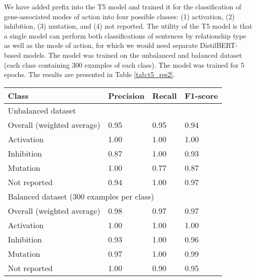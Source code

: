 \documentclass[final,12pt,3p,times,twocolumn,authoryear]{elsarticle}
\begin{document}
We have added prefix into the T5 model and trained it for the classification of gene-associated modes of action into four possible classes: (1) activation, (2) inhibition, (3) mutation, and  (4) not reported. The utility of the T5 model is that a single model can perform both classifications of sentences by relationship type as well as the mode of action, for which we would need separate DistilBERT-based models.  The model was trained on the unbalanced and balanced dataset (each class containing 300 examples of each class). The model was trained for 5 epochs. The results are presented in Table \ref{tab:t5_res2}. 


\begin{table*}[!t]
    \centering
    \begin{tabular}{|l|l|l|l|}
    \hline
        Class & Precision & Recall & F1-score \\ \hline
        \multicolumn{4}{|l|}{Unbalanced dataset}   \\  \hline
        \hspace*{3mm} Overall (weighted average) &   0.95 &  0.95  &  0.94  \\
        
        \hspace*{6mm} Activation & 1.00    &  1.00    &  1.00 \\
        \hspace*{6mm} Inhibition   & 0.87   &  1.00  &   0.93 \\
        \hspace*{6mm} Mutation &    1.00  &    0.77   &   0.87 \\
        \hspace*{6mm} Not reported  &  0.94   &   1.00   &   0.97\\
       
        
         \multicolumn{4}{|l|}{Balanced dataset (300 examples per class)}  \\  \hline  
                \hspace*{3mm} Overall (weighted average) &   0.98    & 0.97   &   0.97  \\
        
        \hspace*{6mm} Activation & 1.00    &  1.00    &  1.00 \\
        \hspace*{6mm} Inhibition   &    0.93   &  1.00   &  0.96  \\
        \hspace*{6mm} Mutation &    0.97   &  1.00   &   0.99 \\
        \hspace*{6mm} Not reported  &   1.00  &   0.90  &   0.95\\
        \hline
    \end{tabular}
    \caption{Results of the best performing mode-of-action T5 model}
    \label{tab:t5_res2}
\end{table*}  
\end{document}
